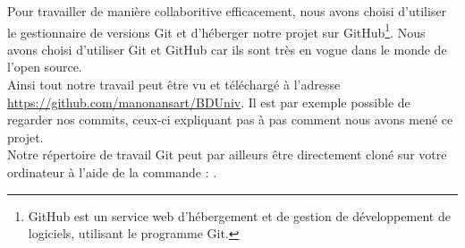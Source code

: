 Pour travailler de manière collaboritive efficacement, nous avons choisi d'utiliser le gestionnaire de versions Git et d'héberger notre projet sur GitHub\footnote{GitHub est un service web d'hébergement et de gestion de développement de logiciels, utilisant le programme Git.}. Nous avons choisi d'utiliser Git et GitHub car ils sont très en vogue dans le monde de l'open source.\\ 

Ainsi tout notre travail peut être vu et téléchargé à l'adresse \url{https://github.com/manonansart/BDUniv}. Il est par exemple possible de regarder nos commits, ceux-ci expliquant pas à pas comment nous avons mené ce projet.\\ 

Notre répertoire de travail Git peut par ailleurs être directement cloné sur votre ordinateur à l'aide de la commande : .